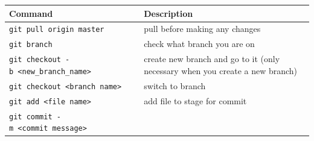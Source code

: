 \documentclass[]{book}
\begin{document}
\begin{longtable}[]{@{}ll@{}}
\toprule
\begin{minipage}[b]{0.77\columnwidth}\raggedright
Command\strut
\end{minipage} & \begin{minipage}[b]{0.17\columnwidth}\raggedright
Description\strut
\end{minipage}\tabularnewline
\midrule
\endhead
\begin{minipage}[t]{0.77\columnwidth}\raggedright
\texttt{git\ pull\ origin\ master}\strut
\end{minipage} & \begin{minipage}[t]{0.17\columnwidth}\raggedright
pull before making any changes\strut
\end{minipage}\tabularnewline
\begin{minipage}[t]{0.77\columnwidth}\raggedright
\texttt{git\ branch}\strut
\end{minipage} & \begin{minipage}[t]{0.17\columnwidth}\raggedright
check what branch you are on\strut
\end{minipage}\tabularnewline
\begin{minipage}[t]{0.77\columnwidth}\raggedright
\texttt{git\ checkout\ -b\ \textless{}new\_branch\_name\textgreater{}}\strut
\end{minipage} & \begin{minipage}[t]{0.17\columnwidth}\raggedright
create new branch and go to it (only necessary when you create a new branch)\strut
\end{minipage}\tabularnewline
\begin{minipage}[t]{0.77\columnwidth}\raggedright
\texttt{git\ checkout\ \textless{}branch\ name\textgreater{}}\strut
\end{minipage} & \begin{minipage}[t]{0.17\columnwidth}\raggedright
switch to branch\strut
\end{minipage}\tabularnewline
\begin{minipage}[t]{0.77\columnwidth}\raggedright
\texttt{git\ add\ \textless{}file\ name\textgreater{}}\strut
\end{minipage} & \begin{minipage}[t]{0.17\columnwidth}\raggedright
add file to stage for commit\strut
\end{minipage}\tabularnewline
\begin{minipage}[t]{0.77\columnwidth}\raggedright
\texttt{git\ commit\ -m\ \textless{}commit\ message\textgreater{}}\strut

\end{minipage}
\end{longtable}
\end{document}

